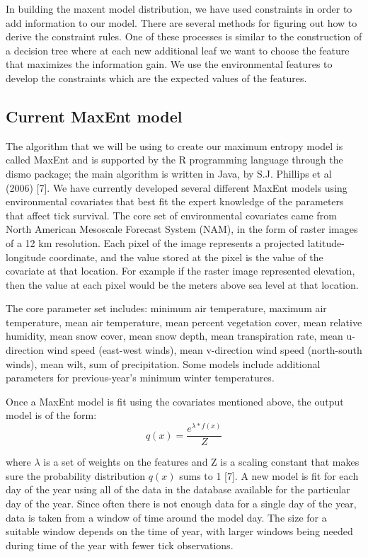 \noindent In building the maxent model distribution, we have used constraints in order to add information to our model. There are several methods for figuring out how to derive the constraint rules. One of these processes is similar to the construction of a decision tree where at each new additional leaf we want to choose the feature that maximizes the information gain. We use the environmental features to develop the constraints which are the expected values of the features.\newline

\subsection{Current MaxEnt model}

\noindent The algorithm that we will be using to create our maximum entropy model is called MaxEnt and is supported by the R programming language through the dismo package; the main algorithm is written in Java, by S.J. Phillips et al (2006) [7]. We have currently developed several different MaxEnt models using environmental covariates that best fit the expert knowledge of the parameters that affect tick survival. The core set of environmental covariates came from North American Mesoscale Forecast System (NAM), in the form of raster images of a 12 km resolution. Each pixel of the image represents a projected latitude-longitude coordinate, and the value stored at the pixel is the value of the covariate at that location. For example if the raster image represented elevation, then the value at each pixel would be the meters above sea level at that location. \newline

\noindent The core parameter set includes: minimum air temperature, maximum air temperature, mean air temperature, mean percent vegetation cover, mean relative humidity, mean snow cover, mean snow depth, mean transpiration rate, mean u-direction wind speed (east-west winds), mean v-direction wind speed (north-south winds), mean wilt, sum of precipitation. Some models include additional parameters for previous-year's minimum winter temperatures.  \newline

\noindent Once a MaxEnt model is fit using the covariates mentioned above, the output model is of the form:
\begin{equation}
q(x) = \frac{e^{\lambda* f(x)}}{Z}
\end{equation}

\noindent where $\lambda $ is a set of weights on the features and Z is a scaling constant that makes sure the probability distribution $q(x)$ sums to 1 [7]. A new model is fit for each day of the year using all of the data in the database available for the particular day of the year. Since often there is not enough data for a single day of the year, data is taken from a window of time around the model day. The size for a suitable window depends on the time of year, with larger windows being needed during time of the year with fewer tick observations.\newline

